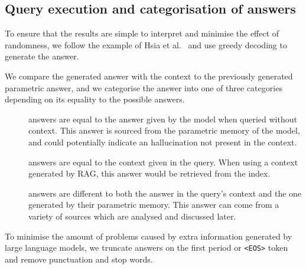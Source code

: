 \subsection{Query execution and categorisation of answers}

To ensure that the results are simple to interpret and minimise the effect of randomness, we follow the example of Hsia et al.~\cite{ragged} and use greedy decoding to generate the answer.

We compare the generated answer with the context to the previously generated parametric answer, and we categorise the answer into one of three categories depending on its equality to the possible answers.

\begin{description}
	\item[\Parametric{}] answers are equal to the answer given by the model when queried without context.
		This answer is sourced from the parametric memory of the model, and could potentially indicate an hallucination not present in the context.
	\item[\Contextual{}] answers are equal to the context given in the query.
		When using a context generated by RAG, this answer would be retrieved from the index.
	\item[\Other] answers are different to both the answer in the query's context and the one generated by their parametric memory.
		This answer can come from a variety of sources which are analysed and discussed later.
\end{description}

To minimise the amount of problems caused by extra information generated by large language models, we truncate answers on the first period or \texttt{<EOS>} token and remove punctuation and stop words.

